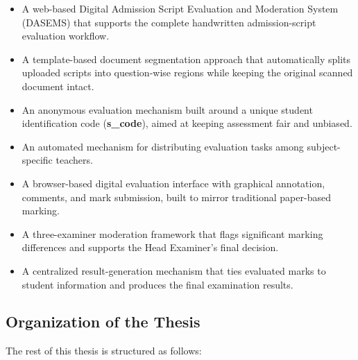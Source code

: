 \begin{itemize}

\item A web-based Digital Admission Script Evaluation and Moderation System (DASEMS) that supports the complete handwritten admission-script evaluation workflow.

\item A template-based document segmentation approach that automatically splits uploaded scripts into question-wise regions while keeping the original scanned document intact.

\item An anonymous evaluation mechanism built around a unique student identification code (\textbf{s\_code}), aimed at keeping assessment fair and unbiased.

\item An automated mechanism for distributing evaluation tasks among subject-specific teachers.

\item A browser-based digital evaluation interface with graphical annotation, comments, and mark submission, built to mirror traditional paper-based marking.

\item A three-examiner moderation framework that flags significant marking differences and supports the Head Examiner's final decision.

\item A centralized result-generation mechanism that ties evaluated marks to student information and produces the final examination results.

\end{itemize}

\subsection{Organization of the Thesis}

The rest of this thesis is structured as follows:

